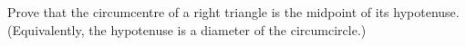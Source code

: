 Prove that the circumcentre of a right triangle is the midpoint of its hypotenuse. (Equivalently, the hypotenuse is a diameter of the circumcircle.)
